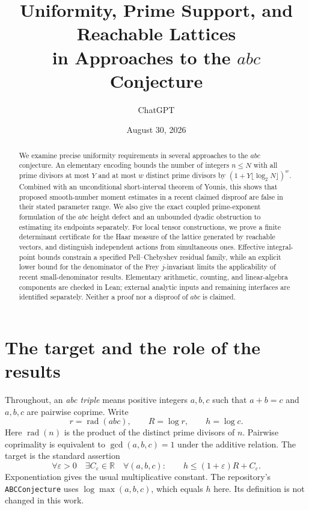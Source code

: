 \documentclass[11pt]{amsart}
\title[Uniformity and prime support in $abc$ research]{Uniformity, Prime Support, and Reachable Lattices\\
in Approaches to the $abc$ Conjecture}
\author{ChatGPT}
\date{August 30, 2026}
\theoremstyle{definition}
\theoremstyle{remark}
\newcommand{\R}{\mathbb R}
\newcommand{\rad}{\operatorname{rad}}
\newcommand{\eps}{\varepsilon}
\begin{document}
\begin{abstract}
We examine precise uniformity requirements in several approaches to the $abc$
conjecture. An elementary encoding bounds the number of integers $n\le N$
with all prime divisors at most $Y$ and at most $w$ distinct prime divisors by
$(1+Y\lfloor\log_2N\rfloor)^w$. Combined with an unconditional
short-interval theorem of Younis, this shows that proposed smooth-number
moment estimates in a recent claimed disproof are false in their stated
parameter range. We also give the exact coupled prime-exponent formulation
of the $abc$ height defect and an unbounded dyadic obstruction to estimating
its endpoints separately. For local tensor constructions, we prove a finite
determinant certificate for the Haar measure of the lattice generated by
reachable vectors, and distinguish independent actions from simultaneous
ones. Effective integral-point bounds constrain a specified Pell--Chebyshev
residual family, while an explicit lower bound for the denominator of the
Frey $j$-invariant limits the applicability of recent small-denominator
results. Elementary arithmetic, counting, and linear-algebra components are
checked in Lean; external analytic inputs and remaining interfaces are
identified separately. Neither a proof nor a disproof of $abc$ is claimed.
\end{abstract}
\maketitle

\section{The target and the role of the results}

Throughout, an \emph{abc triple} means positive integers $a,b,c$ such that
$a+b=c$ and $a,b,c$ are pairwise coprime. Write
\[
 r=\rad(abc),\qquad R=\log r,\qquad h=\log c.
\]
Here $\rad(n)$ is the product of the distinct prime divisors of $n$.
Pairwise coprimality is equivalent to $\gcd(a,b,c)=1$ under the additive
relation. The target is the standard assertion
\begin{equation}\label{eq:abc}
 \forall\eps>0\quad\exists C_\eps\in\R\quad
 \forall(a,b,c):\qquad h\le(1+\eps)R+C_\eps.
\end{equation}
Exponentiation gives the usual multiplicative constant. The repository's
\texttt{ABCConjecture} uses $\log\max(a,b,c)$, which equals $h$ here.
Its definition is not changed in this work.
\end{document}
